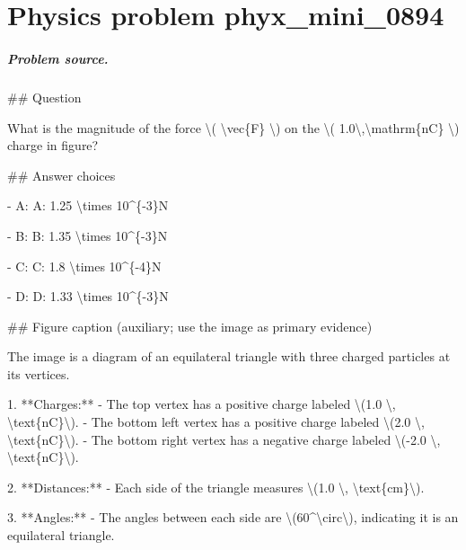 
\chapter{Physics problem phyx\_mini\_0894}
\label{ch:PhyXMiniProblems_problem_phyx_mini_0894}

\paragraph{Problem source.}
\#\# Question

What is the magnitude of the force \textbackslash{}( \textbackslash{}vec\{F\} \textbackslash{}) on the \textbackslash{}( 1.0\textbackslash{},\textbackslash{}mathrm\{nC\} \textbackslash{}) charge in figure?

\#\# Answer choices

- A: A: 1.25 \textbackslash{}times 10\textasciicircum{}\{-3\}N

- B: B: 1.35 \textbackslash{}times 10\textasciicircum{}\{-3\}N

- C: C: 1.8 \textbackslash{}times 10\textasciicircum{}\{-4\}N

- D: D: 1.33 \textbackslash{}times 10\textasciicircum{}\{-3\}N

\#\# Figure caption (auxiliary; use the image as primary evidence)

The image is a diagram of an equilateral triangle with three charged particles at its vertices. 

1. **Charges:**
   - The top vertex has a positive charge labeled \textbackslash{}(1.0 \textbackslash{}, \textbackslash{}text\{nC\}\textbackslash{}).
   - The bottom left vertex has a positive charge labeled \textbackslash{}(2.0 \textbackslash{}, \textbackslash{}text\{nC\}\textbackslash{}).
   - The bottom right vertex has a negative charge labeled \textbackslash{}(-2.0 \textbackslash{}, \textbackslash{}text\{nC\}\textbackslash{}).

2. **Distances:**
   - Each side of the triangle measures \textbackslash{}(1.0 \textbackslash{}, \textbackslash{}text\{cm\}\textbackslash{}).

3. **Angles:**
   - The angles between each side are \textbackslash{}(60\textasciicircum{}\textbackslash{}circ\textbackslash{}), indicating it is an equilateral triangle. 

